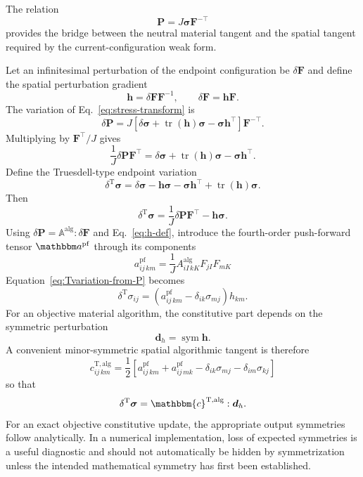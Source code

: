 \documentclass[11pt,a4paper]{article}
\newcommand{\bs}[1]{\boldsymbol{#1}}
\newcommand{\tr}{\operatorname{tr}}
\newcommand{\sym}{\operatorname{sym}}
\newcommand{\F}{\bs{F}}
\newcommand{\Pstress}{\bs{P}}
\newcommand{\sig}{\bs{\sigma}}
\newcommand{\Aalg}{\mathbb{A}^{\mathrm{alg}}}
\newcommand{\calgT}{\mathbbm{c}^{\mathrm{T,alg}}}
\begin{document}
The relation
\begin{equation}
\Pstress=J\sig\F^{-\top}
\end{equation}
provides the bridge between the neutral material tangent and the spatial tangent required by the current-configuration weak form.

Let an infinitesimal perturbation of the endpoint configuration be $\delta\F$ and define the spatial perturbation gradient
\begin{equation}
\bs{h}=\delta\F\F^{-1},
\qquad
\delta\F=\bs{h}\F.
\label{eq:h-def}
\end{equation}
The variation of Eq.~\eqref{eq:stress-transform} is
\begin{equation}
\delta\Pstress
=
J\left[
\delta\sig
+\tr(\bs{h})\sig
-\sig\bs{h}^\top
\right]\F^{-\top}.
\label{eq:variation-P}
\end{equation}
Multiplying by $\F^\top/J$ gives
\begin{equation}
\frac{1}{J}\delta\Pstress\F^\top
=
\delta\sig
+\tr(\bs{h})\sig
-\sig\bs{h}^\top.
\end{equation}
Define the Truesdell-type endpoint variation
\begin{equation}
\delta^{\mathrm{T}}\sig
=
\delta\sig
-\bs{h}\sig
-\sig\bs{h}^\top
+\tr(\bs{h})\sig.
\end{equation}
Then
\begin{equation}
\boxed{
\delta^{\mathrm{T}}\sig
=
\frac{1}{J}\delta\Pstress\F^\top
-\bs{h}\sig
}.
\label{eq:Tvariation-from-P}
\end{equation}
Using $\delta\Pstress=\Aalg:\delta\F$ and Eq.~\eqref{eq:h-def}, introduce the fourth-order push-forward tensor $\mathbbm a^{\mathrm{pf}}$ through its components
\begin{equation}
\boxed{
a^{\mathrm{pf}}_{ij\,km}
=
\frac{1}{J}
A^{\mathrm{alg}}_{iI\,kK}
F_{jI}F_{mK}
}
\label{eq:a-pushforward}
\end{equation}
Equation~\eqref{eq:Tvariation-from-P} becomes
\begin{equation}
\delta^{\mathrm{T}}\sigma_{ij}
=
\left(
a^{\mathrm{pf}}_{ij\,km}
-\delta_{ik}\sigma_{mj}
\right)h_{km}.
\label{eq:Tvariation-components}
\end{equation}
For an objective material algorithm, the constitutive part depends on the symmetric perturbation
\begin{equation}
\bs{d}_h=\sym\bs{h}.
\end{equation}
A convenient minor-symmetric spatial algorithmic tangent is therefore
\begin{equation}
\boxed{
 c^{\mathrm{T,alg}}_{ij\,km}
=
\frac{1}{2}
\left[
a^{\mathrm{pf}}_{ij\,km}
+a^{\mathrm{pf}}_{ij\,mk}
-\delta_{ik}\sigma_{mj}
-\delta_{im}\sigma_{kj}
\right]
}
\label{eq:cT-from-A}
\end{equation}
so that
\begin{equation}
\delta^{\mathrm{T}}\sig
=\calgT:\bs{d}_h.
\end{equation}
For an exact objective constitutive update, the appropriate output symmetries follow analytically. In a numerical implementation, loss of expected symmetries is a useful diagnostic and should not automatically be hidden by symmetrization unless the intended mathematical symmetry has first been established.
\end{document}
